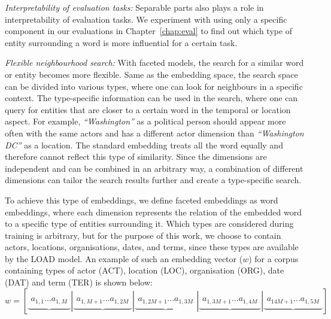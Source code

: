 \begin{compactitem}
\item \emph{Interpretability of evaluation tasks:} Separable parts also plays a role in interpretability of evaluation tasks. We experiment with using only a specific component in our evaluations in Chapter~\ref{chap:eval} to find out which type of entity surrounding a word is more influential for a certain task.\\

\item \emph{Flexible neighbourhood search:} With faceted models, the search for a similar word or entity becomes more flexible. Same as the embedding space, the search space can be divided into various types, where one can look for neighbours in a specific context. The type-specific information can be used in the search, where one can query for entities that are closer to a certain word in the temporal or location aspect. For example, \emph{``Washington''} as a political person should appear more often with the same actors and has a different actor dimension than \emph{``Washington DC''} as a location. The standard embedding treats all the word equally and therefore cannot reflect this type of similarity. Since the dimensions are independent and can be combined in an arbitrary way, a combination of different dimensions can tailor the search results further and create a type-specific search. 
\end{compactitem}
To achieve this type of embeddings, we define faceted embeddings as word embeddings, where each dimension represents the relation of the embedded word to a specific type of entities surrounding it. Which types are considered during training is arbitrary, but for the purpose of this work, we choose to contain actors, locations, organisations, dates, and terms, since these types are available by the LOAD model. An example of such an embedding vector ($w$) for a corpus containing types of actor (ACT), location (LOC), organisation (ORG), date (DAT) and term (TER) is shown below: \\
\mathleft
\begin{equation}
w=\left[ \underbrace { \begin{matrix}{ a }_{ 1,1 } ... { a }_{ 1,M } \end{matrix} } |\underbrace { \begin{matrix}{ a }_{ 1,M+1 } ... { a }_{ 1,2M } \end{matrix} } |\underbrace { \begin{matrix}{ a }_{ 1,2M+1 } ... { a }_{ 1,3M } \end{matrix} } |\underbrace { \begin{matrix}{ a }_{ 1,3M+1 } ... { a }_{ 1,4M } \end{matrix} } |\underbrace { \begin{matrix}{ a }_{ 14M+1 } ... { a }_{ 1,5M } \end{matrix} }  \right] 
\label{eq:concat_vec}
\end{equation}
